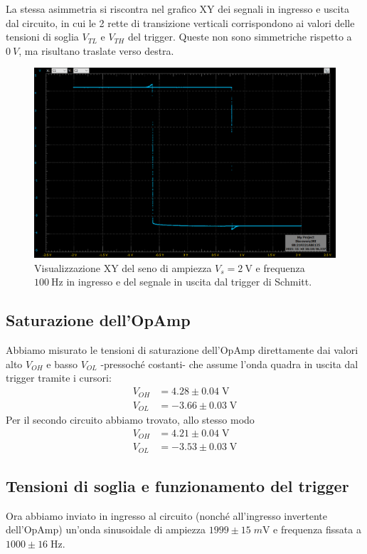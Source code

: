 \documentclass[10pt, a4paper, italian]{article}
\begin{document}
La stessa asimmetria si riscontra nel grafico XY dei segnali in ingresso e
uscita dal circuito, in cui le 2 rette di transizione verticali corrispondono
ai valori delle tensioni di soglia $V_{TL}$ e $V_{TH}$ del trigger. Queste
non sono simmetriche rispetto a $\SI{0}{V}$, ma risultano traslate verso
destra.
\begin{figure}[htbp]
\centering
\includegraphics[scale=0.4]{shmitt_isteresi}
\caption{Visualizzazione XY del seno di ampiezza $V_s = \SI{2}{\V}$ e
frequenza $\SI{100}{\Hz}$ in ingresso e del segnale in uscita dal trigger di
Schmitt. \label{fig: schmittxy}}
\end{figure}

\subsection{Saturazione dell'OpAmp}
Abbiamo misurato le tensioni di saturazione dell'OpAmp direttamente
dai valori alto $V_{OH}$ e basso $V_{OL}$ -pressoché costanti- che assume
l'onda quadra in uscita dal trigger tramite i cursori:
\begin{align*}
V_{OH} &= 4.28 \pm 0.04 \; \si{\V} \\
V_{OL} &= -3.66 \pm 0.03 \; \si{\V}
\end{align*}
Per il secondo circuito abbiamo trovato, allo stesso modo
\begin{align*}
V_{OH} &= 4.21 \pm 0.04 \; \si{\V} \\
V_{OL} &= -3.53 \pm 0.03 \; \si{\V}
\end{align*}

\subsection{Tensioni di soglia e funzionamento del trigger}
Ora abbiamo inviato in ingresso al circuito (nonché all'ingresso invertente
dell'OpAmp) un'onda sinusoidale di ampiezza
$1999 \pm 15 \; \si{m\V}$ e frequenza fissata a $1000 \pm 16 \; \si{\Hz}$.
\end{document}
